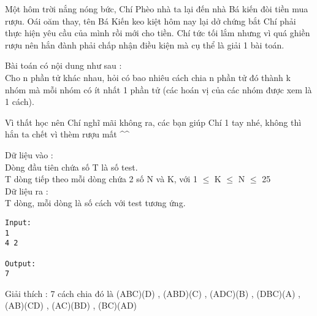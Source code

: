 



   Một hôm trời nắng nóng bức, Chí Phèo nhà ta lại đến nhà Bá kiến đòi tiền mua rượu. Oái oăm thay, tên Bá Kiến keo kiệt hôm nay lại dở chứng bắt Chí phải thực hiện yêu cầu của mình rồi mới cho tiền. Chí tức tối lắm nhưng vì quá ghiền rượu nên hắn đành phải chấp nhận điều kiện mà cụ thể là giải 1 bài toán.  

   Bài toán có nội dung như sau :   
\\   Cho n phần tử khác nhau, hỏi có bao nhiêu cách chia n phần tử đó thành k nhóm mà mỗi nhóm có ít nhất 1 phần tử (các hoán vị của các nhóm được xem là 1 cách).  

   Vì thất học nên Chí nghĩ mãi không ra, các bạn giúp Chí 1 tay nhé, không thì hắn ta chết vì thèm rượu mất \textasciicircum\textasciicircum  

       Dữ liệu vào :      
\\   Dòng đầu tiên chứa số T là số test.   
\\   T dòng tiếp theo mỗi dòng chứa 2 số N và K, với 1 $\le$ K $\le$ N $\le$ 25   
\\       Dữ liệu ra :      
\\   T dòng, mỗi dòng là số cách với test tương ứng.  
\begin{verbatim}
Input:
1
4 2

Output:
7
\end{verbatim}

   Giải thích : 7 cách chia đó là (ABC)(D) , (ABD)(C) , (ADC)(B) , (DBC)(A) , (AB)(CD) , (AC)(BD) , (BC)(AD)  
